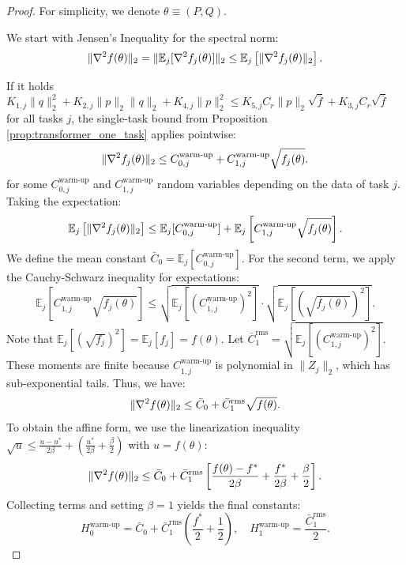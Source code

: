 \documentclass[a4paper,11pt]{article}
\DeclarePairedDelimiter{\norm}{\|}{\|}
\newcommand{\EE}{\mathbb{E}}
\newcommand{\1}{\mathbbm{1}}
\theoremstyle{plain}
\begin{document}
\begin{proof}
For simplicity, we denote $\theta \equiv (P,Q)$.

We start with Jensen's Inequality for the spectral norm:
\begin{equation*}
    \norm{\nabla^2 f(\theta)}_2 = \norm{\EE_j [\nabla^2 f_j(\theta)]}_2 \le \EE_j \left[ \norm{\nabla^2 f_j(\theta)}_2 \right].
\end{equation*}

If it holds $K_{1,j} \|q\|_2^2 + K_{2,j} \|p\|_2 \|q\|_2 + K_{4,j} \|p\|_2^2 \leq K_{5,j} C_r \|p\|_2 \sqrt{\bar{f}} +
    K_{3,j} C_r \sqrt{\bar{f}}$ for all tasks $j$, the single-task bound from Proposition \ref{prop:transformer_one_task} applies pointwise:
\begin{equation}
    \norm{\nabla^2 f_j(\theta)}_2 \le C_{0,j}^{\text{warm-up}} + C_{1,j}^{\text{warm-up}} \sqrt{f_j(\theta)}.
\end{equation}
for some $C_{0,j}^{\text{warm-up}}$ and $C_{1,j}^{\text{warm-up}}$ random variables depending on the data of task $j$.
Taking the expectation:
\begin{equation*}
    \EE_j \left[ \norm{\nabla^2 f_j(\theta)}_2 \right] \le \EE_j [C_{0,j}^{\text{warm-up}}] + \EE_j \left[ C_{1,j}^{\text{warm-up}} \sqrt{f_j(\theta)} \right].
\end{equation*}
We define the mean constant $\bar{C}_0 = \EE_j [C_{0,j}^{\text{warm-up}}]$.
For the second term, we apply the Cauchy-Schwarz inequality for expectations:
\begin{equation*}
    \EE_j \left[ C_{1,j}^{\text{warm-up}} \sqrt{f_j(\theta)} \right] \le \sqrt{\EE_j [(C_{1,j}^{\text{warm-up}})^2]} \cdot \sqrt{\EE_j [(\sqrt{f_j(\theta)})^2]}.
\end{equation*}
Note that $\EE_j [(\sqrt{f_j})^2] = \EE_j [f_j] = f(\theta)$.
Let $\bar{C}_1^{\mathrm{rms}} = \sqrt{\EE_j [(C_{1,j}^{\text{warm-up}})^2]}$. These moments are finite because $C_{1,j}^{\text{warm-up}}$ is polynomial in $\|Z_j\|_2$, which has sub-exponential tails.
Thus, we have:
\begin{equation*}
    \norm{\nabla^2 f(\theta)}_2 \le \bar{C}_0 + \bar{C}_1^{\mathrm{rms}} \sqrt{f(\theta)}.
\end{equation*}
To obtain the affine form, we use the linearization inequality $\sqrt{u} \le \frac{u-u^*}{2\beta} + \left(\frac{u^*}{2\beta} + \frac{\beta}{2}\right)$ with $u=f(\theta)$:
\begin{equation*}
    \norm{\nabla^2 f(\theta)}_2 \le \bar{C}_0 + \bar{C}_1^{\mathrm{rms}} \left[ \frac{f(\theta)-f^*}{2\beta} + \frac{f^*}{2\beta} + \frac{\beta}{2} \right].
\end{equation*}
Collecting terms and setting $\beta=1$ yields the final constants:
\begin{equation}
\label{eq:transformers_in_context_warmup_constants}
H_0^{\text{warm-up}} = \bar{C}_0 + \bar{C}_1^{\mathrm{rms}} \left( \frac{f^*}{2} + \frac{1}{2} \right), \quad
    H_1^{\text{warm-up}} = \frac{\bar{C}_1^{\mathrm{rms}}}{2}.
\end{equation}


\end{proof}
\end{document}
